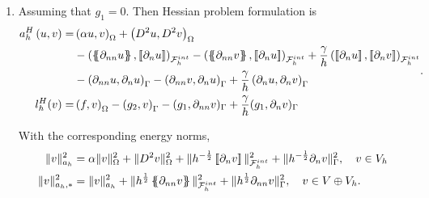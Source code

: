 \begin{enumerate}[label=\arabic*)]
    \item Assuming that $g_{1} = 0$. Then Hessian problem formulation is
\begin{equation}
        \label{eq:cip_hessian_form}
\begin{split}
a_{h}^{H} \left( u, v \right)   =&
    \left( \alpha  u, v \right) _{\Omega }   +  \left( D^2 u, D^2v \right) _{\Omega } \\
 & - \left( \mean{  \partial _{n n} u }, \jump{ \partial _{n }u} \right)_{\mathcal{F}_{h}^{int}}  -
 \left( \mean{ \partial _{n n} v }, \jump{ \partial _{n}u }      \right)_{\mathcal{F}_{h}^{int}}  + \frac{\gamma }{h}  \left( \jump{ \partial _{n} u}, \jump{ \partial _{n} v   }   \right)_{\mathcal{F}_{h}^{int}} \\
 & - \left(   \partial _{n n} u ,  \partial _{n }u \right)_{\Gamma }  -
 \left(  \partial _{n n} v ,  \partial _{n}u       \right)_{\Gamma }  + \frac{\gamma }{h}  \left(  \partial _{n} u,  \partial _{n} v      \right)_{\Gamma } \\
 l_{h}^{H}( v)  =&  \left( f, v \right) _{\Omega }  - \left(g_{2}, v  \right) _{\Gamma } - ( g_{1}, \partial _{nn} v)_{\Gamma } +  \frac{\gamma }{h} ( g_{1} , \partial _{n} v)_{\Gamma }
\end{split}
.
\end{equation}

With the corresponding energy norms,
\begin{equation}
\label{eq:a_cip_energy_norm_hes}
    \begin{split}
 \| v \|_{ a_{h} }^{ 2 }& = \alpha  \| v\|_{ \Omega  }^{2  }  +  \| D ^2 v \|_{ \Omega   }^{ 2 }  + \|  h^{-\frac{1}{2}} \left[\!\left[  \partial _{n} v     \right]\!\right]\|_{  \mathcal{F} _{h}^{int} }^{2  }+ \|  h^{-\frac{1}{2}}  \partial _{n} v    \|_{  \Gamma  }^{2  },  \quad v \in V_{h}  \\
   \| v \|_{ a_{h},* }^{ 2 } &= \| v \|_{ a_{h} }^{ 2 }  + \| h^{\frac{1}{2}}  \left\{\!\!\left\{     \partial _{nn } v\right\}\!\!\right\}  \|_{ \mathcal{F}_{h}^{int}   }^{  2}+ \| h^{\frac{1}{2}} \partial _{nn } v  \|_{ \Gamma    }^{  2}, \quad  v\in V \oplus V_{h}.
    \end{split}
\end{equation}



\end{enumerate}
